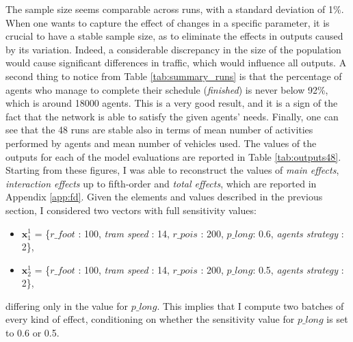 The sample size seems comparable across runs, with a standard deviation of 1\%. When one wants to capture the effect of changes in a specific parameter, it is crucial to have a stable sample size, as to eliminate the effects in outputs caused by its variation. Indeed, a considerable discrepancy in the size of the population would cause significant differences in traffic, which would influence all outputs. A second thing to notice from Table \ref{tab:summary_runs} is that the percentage of agents who manage to complete their schedule (\textit{finished}) is never below 92\%, which is around 18000 agents. This is a very good result, and it is a sign of the fact that the network is able to satisfy the given agents' needs. Finally, one can see that the 48 runs are stable also in terms of mean number of activities performed by agents and mean number of vehicles used. The values of the outputs for each of the model evaluations are reported in Table \ref{tab:outputs48}. Starting from these figures, I was able to reconstruct the values of \textit{main effects}, \textit{interaction effects} up to fifth-order and \textit{total effects}, which are reported in Appendix \ref{app:fd}. Given the elements and values described in the previous section, I considered two vectors with full sensitivity values:
\begin{itemize}
    \item $\mathbf{x}^1_1$ = \{$r\_foot$ : 100, \textit{tram speed} : 14, $r\_pois$ : 200, $p\_long$: 0.6, \textit{agents strategy} : 2\},
    \item $\mathbf{x}^1_2$ = \{$r\_foot$ : 100, \textit{tram speed} : 14, $r\_pois$ : 200, $p\_long$: 0.5, \textit{agents strategy} : 2\},
\end{itemize}
differing only in the value for $p\_long$. This implies that I compute two batches of every kind of effect, conditioning on whether the sensitivity value for $p\_long$ is set to 0.6 or 0.5. 

